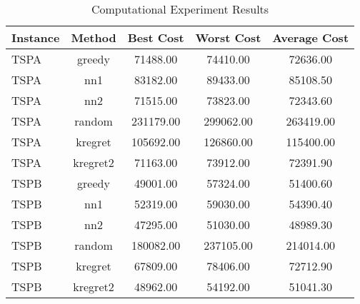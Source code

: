 \begin{table}[ht]
\centering
\caption{Computational Experiment Results}
\label{tab:results}
\begin{tabular}{lcccc}
\hline
Instance & Method & Best Cost & Worst Cost & Average Cost \\
\hline
TSPA & greedy & 71488.00 & 74410.00 & 72636.00 \\
TSPA & nn1 & 83182.00 & 89433.00 & 85108.50 \\
TSPA & nn2 & 71515.00 & 73823.00 & 72343.60 \\
TSPA & random & 231179.00 & 299062.00 & 263419.00 \\
TSPA & kregret & 105692.00 & 126860.00 & 115400.00 \\
TSPA & kregret2 & 71163.00 & 73912.00 & 72391.90 \\
TSPB & greedy & 49001.00 & 57324.00 & 51400.60 \\
TSPB & nn1 & 52319.00 & 59030.00 & 54390.40 \\
TSPB & nn2 & 47295.00 & 51030.00 & 48989.30 \\
TSPB & random & 180082.00 & 237105.00 & 214014.00 \\
TSPB & kregret & 67809.00 & 78406.00 & 72712.90 \\
TSPB & kregret2 & 48962.00 & 54192.00 & 51041.30 \\
\hline
\end{tabular}
\end{table}
